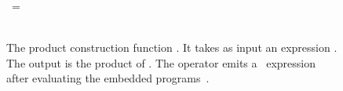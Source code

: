 \begin{figure}[t]
\begin{minipage}[t]{\linewidth}
\begin{minipage}[t]{.94\linewidth}
       \\
      \tabTTT\hspace{-2.3ex}
      \\
       \\
      \tabTT \algLet \var[m]
      \ = \freshvar
      \ \algIn \\
      \tabTTT\hspace{-2.3ex}
      \\
    \end{minipage}
  \end{minipage}
  \caption{The product construction function \product.  It takes as
    input an expression \expr.
    The output is the product of \expr.  The operator
    \quo{$\;\cdot\;$} emits a \miniocaml\ expression after evaluating
    the embedded programs~\aq{$\;\cdot\;$}.  }
  \label{fig-prod-alg}
\end{figure}
\fi
